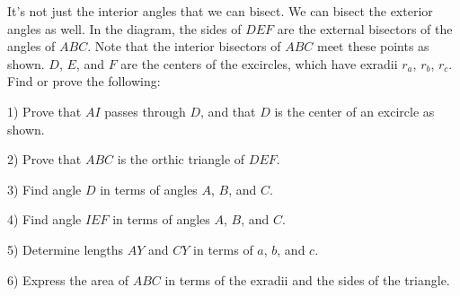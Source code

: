 It's not just the interior angles that we can bisect. We can bisect the exterior angles as well. In the diagram, the sides of $DEF$ are the external bisectors of the angles of $ABC$. Note that the interior bisectors of $ABC$ meet these points as shown. $D$, $E$, and $F$ are the centers of the excircles, which have exradii $r_a$, $r_b$, $r_c$. Find or prove the following:

1) Prove that $AI$ passes through $D$, and that $D$ is the center of an excircle as shown.

2) Prove that $ABC$ is the orthic triangle of $DEF$.

3) Find angle $D$ in terms of angles $A$, $B$, and $C$.

4) Find angle $IEF$ in terms of angles $A$, $B$, and $C$.

5) Determine lengths $AY$ and $CY$ in terms of $a$, $b$, and $c$.

6) Express the area of $ABC$ in terms of the exradii and the sides of the triangle.

